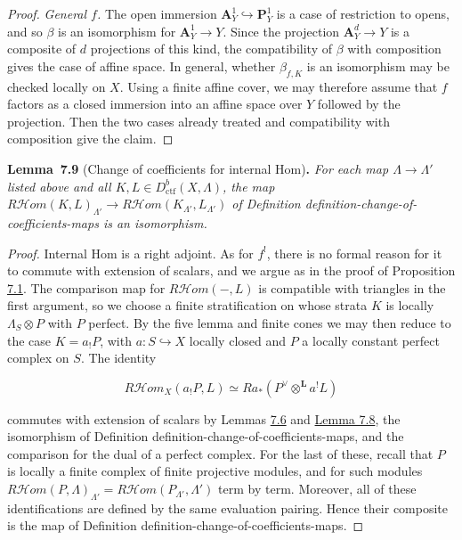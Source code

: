 \documentclass[11pt]{article}
\newenvironment{bpstatement}[2]{\par\addvspace{0.6\baselineskip}\noindent\textbf{#1}#2\textbf{.}\enspace\ignorespaces}
  {\par\addvspace{0.4\baselineskip}}
\newenvironment{bpstatementit}[2]{\begin{bpstatement}{#1}{#2}\itshape\ignorespaces}{\end{bpstatement}}
\providecommand{\cHom}{}\renewcommand{\cHom}{R\mathcal{H}\!om}
\begin{document}
\begin{proof}[{Proof}]
\emph{General \(f\).} The open immersion \(\mathbf A^1_Y\hookrightarrow\mathbf P^1_Y\) is a case of restriction to opens, and so \(\beta\) is an isomorphism for \(\mathbf A^1_Y\to Y\). Since the projection \(\mathbf A^d_Y\to Y\) is a composite of \(d\) projections of this kind, the compatibility of \(\beta\) with composition gives the case of affine space. In general, whether \(\beta_{f,K}\) is an isomorphism may be checked locally on \(X\). Using a finite affine cover, we may therefore assume that \(f\) factors as a closed immersion into an affine space over \(Y\) followed by the projection. Then the two cases already treated and compatibility with composition give the claim.
\end{proof}

\label{bp623}%
\begin{bpstatementit}{Lemma~7.9}{ (Change of coefficients for internal Hom)}
For each map \(\Lambda\to\Lambda'\) listed above and all \(K,L\in D^b_{\mathrm{ctf}}(X,\Lambda)\), the map \(\cHom(K,L)_{\Lambda'}\to\cHom(K_{\Lambda'},L_{\Lambda'})\) of Definition definition-change-of-coefficients-maps is an isomorphism.
\end{bpstatementit}

\begin{proof}[{Proof}]\label{bp624}%
Internal Hom is a right adjoint. As for \(f^!\), there is no formal reason for it to commute with extension of scalars, and we argue as in the proof of Proposition \hyperref[bp605]{7.1}. The comparison map for \(\cHom(-,L)\) is compatible with triangles in the first argument, so we choose a finite stratification on whose strata \(K\) is locally \(\Lambda_S\otimes P\) with \(P\) perfect. By the five lemma and finite cones we may then reduce to the case \(K=a_!P\), with \(a:S\hookrightarrow X\) locally closed and \(P\) a locally constant perfect complex on \(S\). The identity

\[
\cHom_X(a_!P,L)
\simeq Ra_*(P^\vee\otimes^{\mathbf L}a^!L)
\]

commutes with extension of scalars by Lemmas \hyperref[bp616]{7.6} and \hyperref[bp621]{Lemma 7.8}, the isomorphism of Definition definition-change-of-coefficients-maps, and the comparison for the dual of a perfect complex. For the last of these, recall that \(P\) is locally a finite complex of finite projective modules, and for such modules \(\cHom(P,\Lambda)_{\Lambda'}=\cHom(P_{\Lambda'},\Lambda')\) term by term. Moreover, all of these identifications are defined by the same evaluation pairing. Hence their composite is the map of Definition definition-change-of-coefficients-maps.
\end{proof}
\end{document}
